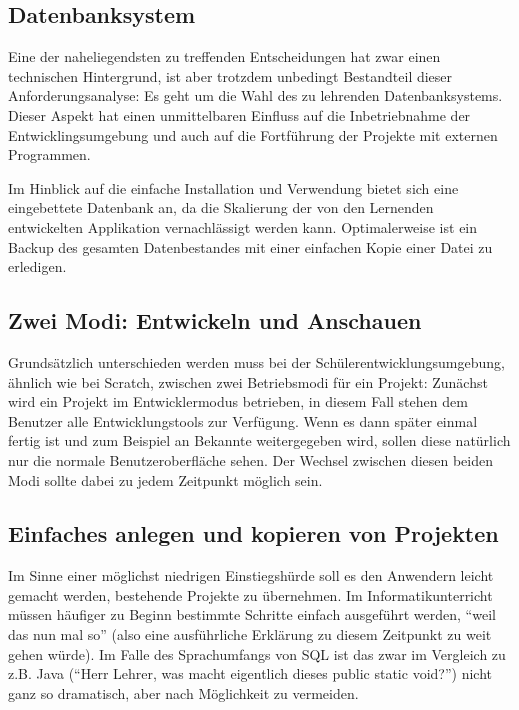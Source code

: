 \documentclass[paper=a4,fontsize=11pt,parskip=half]{scrartcl}
\begin{document}
\subsection{Datenbanksystem}

Eine der naheliegendsten zu treffenden Entscheidungen hat zwar einen technischen Hintergrund, ist aber trotzdem unbedingt Bestandteil dieser Anforderungsanalyse: Es geht um die Wahl des zu lehrenden Datenbanksystems. Dieser Aspekt hat einen unmittelbaren Einfluss auf die Inbetriebnahme der Entwicklingsumgebung und auch auf die Fortführung der Projekte mit externen Programmen.

Im Hinblick auf die einfache Installation und Verwendung bietet sich eine eingebettete Datenbank an, da die Skalierung der von den Lernenden entwickelten Applikation vernachlässigt werden kann. Optimalerweise ist ein Backup des gesamten Datenbestandes mit einer einfachen Kopie einer Datei zu erledigen.


\subsection{Zwei Modi: Entwickeln und Anschauen}

Grundsätzlich unterschieden werden muss bei der Schülerentwicklungsumgebung, ähnlich wie bei Scratch, zwischen zwei Betriebsmodi für ein Projekt: Zunächst wird ein Projekt im Entwicklermodus betrieben, in diesem Fall stehen dem Benutzer alle Entwicklungstools zur Verfügung. Wenn es dann später einmal fertig ist und zum Beispiel an Bekannte weitergegeben wird, sollen diese natürlich nur die normale Benutzeroberfläche sehen. Der Wechsel zwischen diesen beiden Modi sollte dabei zu jedem Zeitpunkt möglich sein.

\subsection{Einfaches anlegen und kopieren von Projekten}

Im Sinne einer möglichst niedrigen Einstiegshürde soll es den Anwendern leicht gemacht werden, bestehende Projekte zu übernehmen. Im Informatikunterricht müssen häufiger zu Beginn bestimmte Schritte einfach ausgeführt werden, ``weil das nun mal so'' (also eine ausführliche Erklärung zu diesem Zeitpunkt zu weit gehen würde). Im Falle des Sprachumfangs von SQL ist das zwar im Vergleich zu z.B. Java (``Herr Lehrer, was macht eigentlich dieses public static void?'') nicht ganz so dramatisch, aber nach Möglichkeit zu vermeiden.
\end{document}
